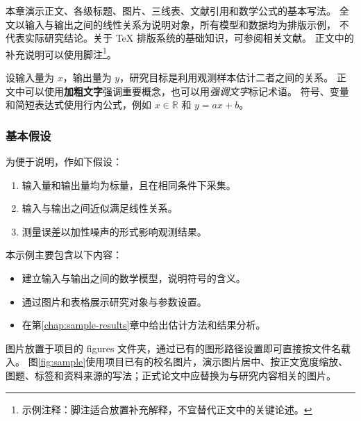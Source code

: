 \label{chap:sample-background}

\label{sec:sample-objectives}

本章演示正文、各级标题、图片、三线表、文献引用和数学公式的基本写法。
全文以输入与输出之间的线性关系为说明对象，所有模型和数据均为排版示例，
不代表实际研究结论。关于 \TeX{} 排版系统的基础知识，可参阅相关文献\cite{samplebook}。
正文中的补充说明可以使用脚注\footnote{示例注释：脚注适合放置补充解释，不宜替代正文中的关键论述。}。


设输入量为 $x$，输出量为 $y$，研究目标是利用观测样本估计二者之间的关系。
正文中可以使用\textbf{加粗文字}强调重要概念，也可以用\emph{强调文字}标记术语。
符号、变量和简短表达式使用行内公式，例如 $x \in \mathbb{R}$ 和 $y = ax + b$。

\subsubsection{基本假设}

为便于说明，作如下假设：
\begin{enumerate}
    \item 输入量和输出量均为标量，且在相同条件下采集。
    \item 输入与输出之间近似满足线性关系。
    \item 测量误差以加性噪声的形式影响观测结果。
\end{enumerate}


本示例主要包含以下内容：
\begin{itemize}
    \item 建立输入与输出之间的数学模型，说明符号的含义。
    \item 通过图片和表格展示研究对象与参数设置。
    \item 在第\ref{chap:sample-results}章中给出估计方法和结果分析。
\end{itemize}


图片放置于项目的 figures 文件夹，通过已有的图形路径设置即可直接按文件名载入。
图\ref{fig:sample}使用项目已有的校名图片，演示图片居中、按正文宽度缩放、
图题、标签和资料来源的写法；正式论文中应替换为与研究内容相关的图片。

